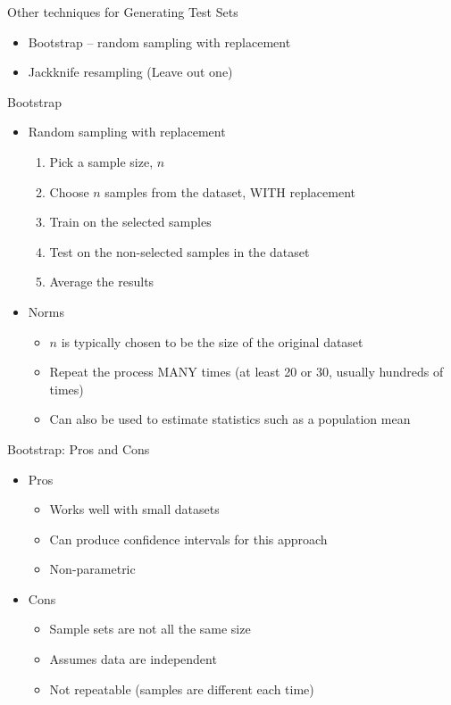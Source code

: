 \documentclass[aspectratio=169]{beamer}
\begin{document}
\begin{frame}[fragile]{Other techniques for Generating Test Sets}

\begin{itemize}
\item Bootstrap -- random sampling with replacement
\item Jackknife resampling (Leave out one)
\end{itemize}
	

\end{frame}

\begin{frame}[fragile]{Bootstrap}

\begin{itemize}
\item Random sampling with replacement
\begin{enumerate}
\item Pick a sample size, $n$
\item Choose $n$ samples from the dataset, WITH replacement
\item Train on the selected samples
\item Test on the non-selected samples in the dataset
\item Average the results
\end{enumerate}
\item Norms
\begin{itemize}
\item $n$ is typically chosen to be the size of the original dataset
\item Repeat the process MANY times (at least 20 or 30, usually hundreds of times)
\item Can also be used to estimate statistics such as a population mean
\end{itemize}
\end{itemize}


\end{frame}
\begin{frame}[fragile]{Bootstrap: Pros and Cons}

\begin{itemize}
\item Pros
\begin{itemize}
\item Works well with small datasets
\item Can produce confidence intervals for this approach
\item Non-parametric
\end{itemize}

\item Cons
\begin{itemize}
\item Sample sets are not all the same size
\item Assumes data are independent
\item Not repeatable (samples are different each time)
\end{itemize}
\end{itemize}


\end{frame}
\end{document}
